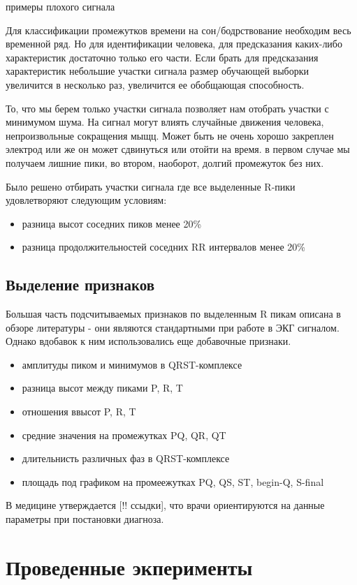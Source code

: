 примеры плохого сигнала

Для классификации промежутков времени на сон/бодрствование необходим весь временной ряд. Но для идентификации человека, для предсказания каких-либо характеристик достаточно только его части. Если брать для предсказания характеристик небольшие участки сигнала размер обучающей выборки увеличится в несколько раз, увеличится ее обобщающая способность.

То, что мы берем только участки сигнала позволяет нам отобрать участки с минимумом шума. На сигнал могут влиять случайные движения человека, непроизвольные сокращения мыщц. Может быть не очень хорошо закреплен электрод или же он может сдвинуться или отойти на время. в первом случае мы получаем лишние пики, во втором, наоборот, долгий промежуток без них. 

Было решено отбирать участки сигнала где все выделенные R-пики удовлетворяют следующим условиям:

\begin{itemize}
	\item разница высот соседних пиков менее 20\%
	\item разница продолжительностей соседних RR интервалов менее 20\%
\end{itemize}

\subsection{Выделение признаков}
Большая часть подсчитываемых признаков по выделенным R пикам описана в обзоре литературы - они являются стандартными при работе в ЭКГ сигналом. Однако вдобавок к ним использовались еще добавочные признаки.
\begin{itemize}
	\item амплитуды пиком и минимумов в QRST-комплексе
	\item разница высот между пиками P, R, T
	\item отношения ввысот P, R, T
	\item средние значения на промежутках PQ, QR, QT
	\item длительнисть различных фаз в QRST-комплексе
	\item площадь под графиком на промеежутках PQ, QS, ST, begin-Q, S-final
\end{itemize}
В медицине утверждается [!! ссыдки], что врачи ориентируются на данные параметры при постановки диагноза.
\section{Проведенные экперименты}

